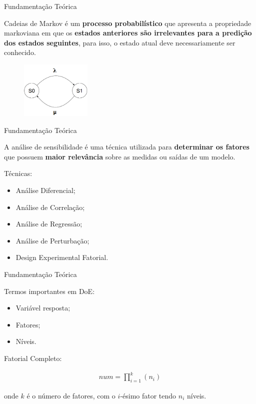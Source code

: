 \documentclass{beamer}
\begin{document}
    \begin{frame}{Fundamentação Teórica}
    
        Cadeias de Markov é um \textbf{processo probabilístico} que apresenta a propriedade markoviana em que os \textbf{estados anteriores são irrelevantes para a predição dos estados seguintes}, para isso, o estado atual deve necessariamente ser conhecido. 
    
        \begin{figure}[ht]
            \includegraphics[width=0.3\textwidth]{img/ctmc_exemplo.png}
        \end{figure}
    
    \end{frame}
    
    \begin{frame}{Fundamentação Teórica}
    
        A análise de sensibilidade é uma técnica utilizada para \textbf{determinar os fatores} que possuem \textbf{maior relevância} sobre as medidas ou saídas de um modelo.
        
        Técnicas:
        
        \begin{itemize}
            \item Análise Diferencial;
            \item Análise de Correlação;
            \item Análise de Regressão;
            \item Análise de Perturbação;
            \item Design Experimental Fatorial.
        \end{itemize}
        
    \end{frame}
    
    \begin{frame}{Fundamentação Teórica}
    
        Termos importantes em DoE:

        \begin{itemize}
            \item Variável resposta;
            \item Fatores;
            \item Níveis.
        \end{itemize}
        
        Fatorial Completo:
        
        \begin{align*}
            num = \prod_{i = 1}^{k} (n_i)
        \end{align*}
        
        onde $k$ é o número de fatores, com o $i$-ésimo fator tendo $n_{i}$ níveis.
        
    \end{frame}
    
\end{document}

